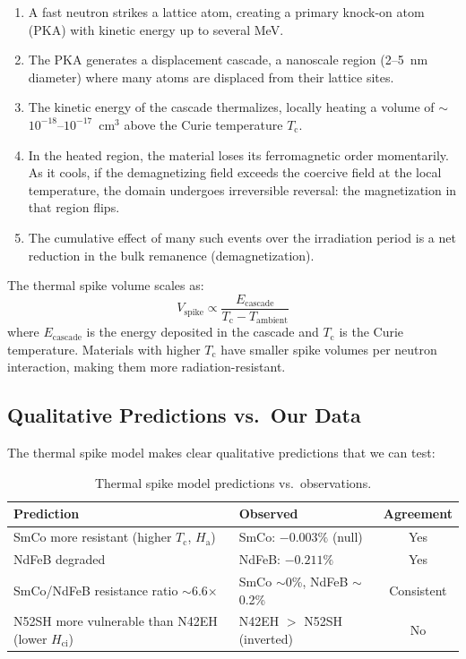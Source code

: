 \documentclass[11pt,letterpaper]{article}
\newcommand{\Tc}{T_\mathrm{c}}
\newcommand{\Ha}{H_\mathrm{a}}
\newcommand{\Hci}{H_\mathrm{ci}}
\begin{document}
\begin{enumerate}
    \item A fast neutron strikes a lattice atom, creating a primary
    knock-on atom (PKA) with kinetic energy up to several MeV.
    \item The PKA generates a displacement cascade, a nanoscale
    region (2--\SI{5}{nm} diameter) where many atoms are displaced from their
    lattice sites.
    \item The kinetic energy of the cascade thermalizes, locally heating a
    volume of $\sim$$10^{-18}$--$10^{-17}$~cm$^3$ above the Curie
    temperature $\Tc$.
    \item In the heated region, the material loses its ferromagnetic order
    momentarily. As it cools, if the demagnetizing field exceeds the
    coercive field at the local temperature, the domain undergoes
    irreversible reversal: the magnetization in that region flips.
    \item The cumulative effect of many such events over the irradiation period
    is a net reduction in the bulk remanence (demagnetization).
\end{enumerate}

The thermal spike volume scales as:
\begin{equation}
    V_\mathrm{spike} \propto \frac{E_\mathrm{cascade}}{T_\mathrm{c} - T_\mathrm{ambient}}
\end{equation}
where $E_\mathrm{cascade}$ is the energy deposited in the cascade and $\Tc$
is the Curie temperature. Materials with higher $\Tc$ have smaller spike
volumes per neutron interaction, making them more radiation-resistant.

\subsection{Qualitative Predictions vs.\ Our Data}

The thermal spike model makes clear qualitative predictions that we can test:

\begin{table}[H]
\centering
\caption{Thermal spike model predictions vs.\ observations.}
\label{tab:spike_predictions}
\begin{tabular}{@{}p{5cm}p{4cm}c@{}}
\toprule
\textbf{Prediction} & \textbf{Observed} & \textbf{Agreement} \\
\midrule
SmCo more resistant (higher $\Tc$, $\Ha$) & SmCo: $-0.003\%$ (null) & Yes \\
NdFeB degraded & NdFeB: $-0.211\%$ & Yes \\
SmCo/NdFeB resistance ratio $\sim$6.6$\times$ & SmCo $\sim$0\%, NdFeB $\sim$0.2\% & Consistent \\
N52SH more vulnerable than N42EH (lower $\Hci$) & N42EH $>$ N52SH (inverted) & No \\
\bottomrule
\end{tabular}
\end{table}
\end{document}
